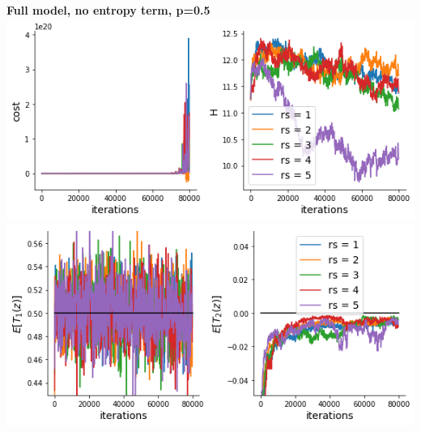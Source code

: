 \documentclass[11pt]{article}
\begin{document}
\begin{center}
\textbf{Full model, no entropy term, p=0.5} \\
\includegraphics[scale=0.6]{figs/cost_H_SC_full_c=0_p=50.png} \\
\includegraphics[scale=0.6]{figs/constraints_SC_full_c=0_p=50.png}
\end{center}
\end{document}
